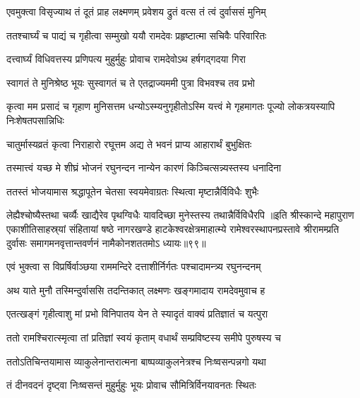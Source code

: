 \twolineshloka
{एवमुक्त्वा विसृज्याथ तं दूतं प्राह लक्ष्मणम्}
{प्रवेशय द्रुतं वत्स तं त्वं दुर्वाससं मुनिम्}%

\twolineshloka
{ततश्चार्घ्यं च पाद्यं च गृहीत्वा सम्मुखो ययौ}
{रामदेवः प्रहृष्टात्मा सचिवैः परिवारितः}%

\twolineshloka
{दत्त्वार्घ्यं विधिवत्तस्य प्रणिपत्य मुहुर्मुहुः}
{प्रोवाच रामदेवोऽथ हर्षगद्गदया गिरा}%

\twolineshloka
{स्वागतं ते मुनिश्रेष्ठ भूयः सुस्वागतं च ते}
{एतद्राज्यममी पुत्रा विभवश्च तव प्रभो}%

\threelineshloka
{कृत्वा मम प्रसादं च गृहाण मुनिसत्तम}
{धन्योऽस्म्यनुगृहीतोऽस्मि यत्त्वं मे गृहमागतः}
{पूज्यो लोकत्रयस्यापि निःशेषतपसान्निधिः}%


\twolineshloka
{चातुर्मास्यव्रतं कृत्वा निराहारो रघूत्तम}
{अद्य ते भवनं प्राप्य आहारार्थं बुभुक्षितः}%

\twolineshloka
{तस्मात्त्वं यच्छ मे शीघ्रं भोजनं रघुनन्दन}
{नान्येन कारणं किञ्चित्सन्न्यस्तस्य धनादिना}%

\twolineshloka
{ततस्तं भोजयामास श्रद्धापूतेन चेतसा}
{स्वयमेवाग्रतः स्थित्वा मृष्टान्नैर्विविधैः शुभैः}%

\twolineshloka
{लेह्यैश्चोष्यैस्तथा चर्व्यैः खाद्यैरेव पृथग्विधैः}
{यावदिच्छा मुनेस्तस्य तथान्नैर्विविधैरपि}%
॥इति श्रीस्कान्दे महापुराण एकाशीतिसाहस्र्यां संहितायां षष्ठे नागरखण्डे हाटकेश्वरक्षेत्रमाहात्म्ये रामेश्वरस्थापनप्रस्तावे श्रीरामम्प्रति दुर्वासः समागमनवृत्तान्तवर्णनं नामैकोनशततमोऽ ध्यायः॥९९॥


\twolineshloka
{एवं भुक्त्वा स विप्रर्षिर्वाञ्छया राममन्दिरे}
{दत्ताशीर्निर्गतः पश्चादामन्त्र्य रघुनन्दनम्}%

\twolineshloka
{अथ याते मुनौ तस्मिन्दुर्वाससि तदन्तिकात्}
{लक्ष्मणः खङ्गमादाय रामदेवमुवाच ह}%

\twolineshloka
{एतत्खङ्गं गृहीत्वाशु मां प्रभो विनिपातय}
{येन ते स्यादृतं वाक्यं प्रतिज्ञातं च यत्पुरा}%

\twolineshloka
{ततो रामश्चिरात्स्मृत्वा तां प्रतिज्ञां स्वयं कृताम्}
{वधार्थं सम्प्रविष्टस्य समीपे पुरुषस्य च}%

\twolineshloka
{ततोऽतिचिन्तयामास व्याकुलेनान्तरात्मना}
{बाष्पव्याकुलनेत्रश्च निःष्वसन्पन्नगो यथा}%

\twolineshloka
{तं दीनवदनं दृष्ट्वा निःष्वसन्तं मुहुर्मुहुः}
{भूयः प्रोवाच सौमित्रिर्विनयावनतः स्थितः}%

